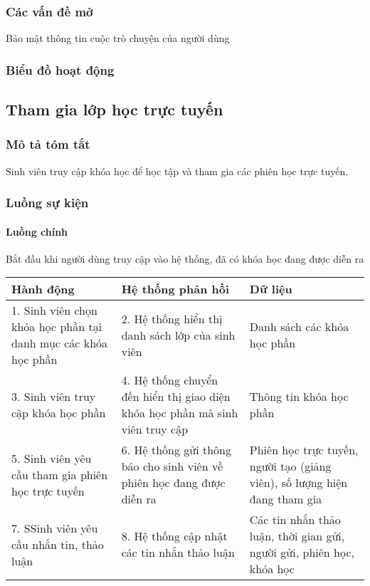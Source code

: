 \documentclass[./../main_file.tex]{subfiles}
\begin{document}
\subsubsection{Các vấn đề mở}
Bảo mật thông tin cuộc trò chuyện của người dùng

\subsubsection{Biểu đồ hoạt động}

\subsection{Tham gia lớp học trực tuyến}
\subsubsection{Mô tả tóm tắt}
Sinh viên truy cập khóa học để học tập và tham gia các phiên học trực tuyến.

\subsubsection{Luồng sự kiện}
\paragraph{Luồng chính}
Bắt đầu khi người dùng truy cập vào hệ thống, đã có khóa học đang được diễn ra
\begin{longtable}{|p{}|p{}|p{}|}
		\hline
		\textbf{Hành động}                                           & \textbf{Hệ thống phản hồi}                                                   & \textbf{Dữ liệu}           \\ \hline
		1. Sinh viên chọn khóa học phần tại danh mục các khóa học phần & 2. Hệ thống hiển thị danh sách lớp của sinh viên                             & Danh sách các khóa học phần \\ \hline
		3. Sinh viên truy cập khóa học phần                           & 4. Hệ thống chuyển đến hiển thị giao diện khóa học phần mà sinh viên truy cập & Thông tin khóa học phần     \\ \hline
		5. Sinh viên yêu cầu tham gia phiên học trực tuyến              & 6. Hệ thống gửi thông báo cho sinh viên về phiên học đang được diễn ra       &  Phiên học trực tuyến, người tạo (giảng viên), số lượng hiện đang tham gia                    \\ \hline
		7. SSinh viên yêu cầu nhắn tin, thảo luận &
		8. Hệ thống cập nhật các tin nhắn thảo luận &
		Các tin nhắn thảo luận, thời gian gửi, người gửi, phiên học, khóa học \\ \hline
\end{longtable}
\end{document}
